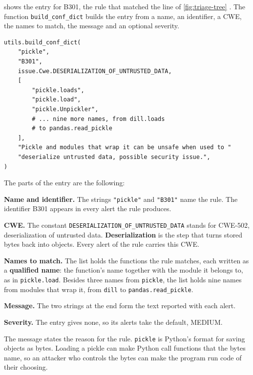  shows the entry for B301, the rule that matched the line of
\cref{fig:triage-tree} \citep{bandit}. The function \texttt{build\_conf\_dict} builds the entry from
a name, an identifier, a CWE, the names to match, the message and an optional severity.

\noindent\begin{minipage}{\linewidth}
\begin{lstlisting}[breakatwhitespace=true, basicstyle=\ttfamily\footnotesize, caption={Bandit's entry for rule B301, with the list of names shortened.}, label=lst:triage-b301]
utils.build_conf_dict(
    "pickle",
    "B301",
    issue.Cwe.DESERIALIZATION_OF_UNTRUSTED_DATA,
    [
        "pickle.loads",
        "pickle.load",
        "pickle.Unpickler",
        # ... nine more names, from dill.loads
        # to pandas.read_pickle
    ],
    "Pickle and modules that wrap it can be unsafe when used to "
    "deserialize untrusted data, possible security issue.",
)
\end{lstlisting}
\end{minipage}

The parts of the entry are the following:
\bi
\item \textbf{Name and identifier.} The strings \texttt{"pickle"} and \texttt{"B301"} name the
rule. The identifier B301 appears in every alert the rule produces.
\item \textbf{CWE.} The constant \texttt{DESERIALIZATION\_OF\_UNTRUSTED\_DATA} stands for CWE-502,
deserialization of untrusted data. \textbf{Deserialization} is the step that turns stored bytes back
into objects. Every alert of the rule carries this CWE.
\item \textbf{Names to match.} The list holds the functions the rule matches, each written as a
\textbf{qualified name}: the function's name together with the module it belongs to, as in
\texttt{pickle.load}. Besides three names from \texttt{pickle}, the list holds nine names from
modules that wrap it, from \texttt{dill} to \texttt{pandas.read\_pickle}.
\item \textbf{Message.} The two strings at the end form the text reported with each alert.
\item \textbf{Severity.} The entry gives none, so its alerts take the default, MEDIUM.
\ei

The message states the reason for the rule. \texttt{pickle} is Python's format for saving objects as
bytes. Loading a pickle can make Python call functions that the bytes name, so an attacker who
controls the bytes can make the program run code of their choosing.

